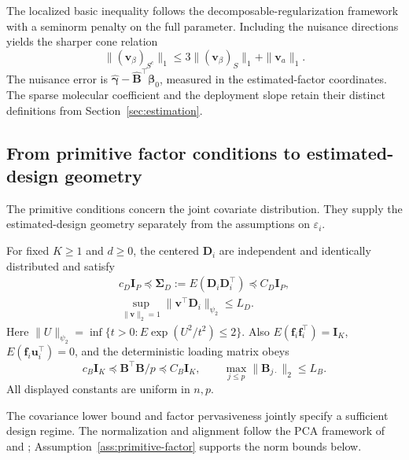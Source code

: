 The localized basic inequality follows the decomposable-regularization framework \citep{NegahbanEtAl2012} with a seminorm penalty on the full parameter. Including the nuisance directions yields the sharper cone relation
\begin{equation}
 \|(\bm{v}_\beta)_{S^c}\|_1\le3\|(\bm{v}_\beta)_S\|_1+\|\bm{v}_a\|_1.
 \label{eq:sharp-cone}
\end{equation}
The nuisance error is $\widehat{\bm{\gamma}}-\widehat{\bm{B}}^\top\bm{\beta}_0$, measured in the estimated-factor coordinates. The sparse molecular coefficient and the deployment slope retain their distinct definitions from Section~\ref{sec:estimation}.

\subsection{From primitive factor conditions to estimated-design geometry}
\label{subsec:primitive-design}
The primitive conditions concern the joint covariate distribution. They supply the estimated-design geometry separately from the assumptions on $\varepsilon_i$.

\begin{assumption}
\label{ass:primitive-factor}
For fixed $K\ge1$ and $d\ge0$, the centered $\bm{D}_i$ are independent and identically distributed and satisfy
\begin{equation}
 \begin{gathered}
c_D \bm{I}_P\preceq\bm{\Sigma}_D:=E(\bm{D}_i\bm{D}_i^\top)\preceq C_D \bm{I}_P,
 \\
\sup_{\|\bm{v}\|_2=1}\|\bm{v}^\top \bm{D}_i\|_{\psi_2}\le L_D.
 \end{gathered}
 \label{eq:primitive-subgaussian}
\end{equation}
Here $\|U\|_{\psi_2}=\inf\{t>0:E\exp(U^2/t^2)\le2\}$. Also $E(\bm{f}_i\bm{f}_i^\top)=\bm{I}_K$, $E(\bm{f}_i\bm{u}_i^\top)=0$, and the deterministic loading matrix obeys
\begin{equation}
 c_B \bm{I}_K\preceq \bm{B}^\top \bm{B}/p\preceq C_B \bm{I}_K,
 \qquad \max_{j\le p}\|\bm{B}_{j\cdot}\|_2\le L_B.
 \label{eq:primitive-loadings}
\end{equation}
All displayed constants are uniform in $n,p$.
\end{assumption}
The covariance lower bound and factor pervasiveness jointly specify a sufficient design regime. The normalization and alignment follow the PCA framework of \citet{BaiNg2013} and \citet{FanEtAl2020}; Assumption~\ref{ass:primitive-factor} supports the norm bounds below.

